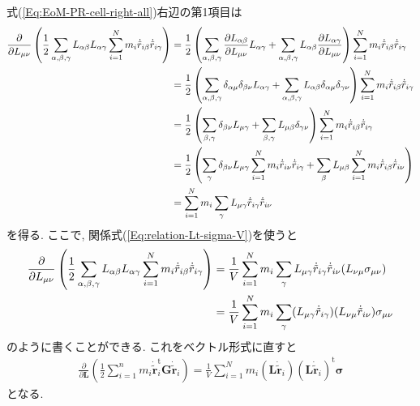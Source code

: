 式(\ref{Eq:EoM-PR-cell-right-all})右辺の第1項目は
\begin{align}
  \frac{\partial}{\partial L_{\mu\nu}}
  \left(
    \frac{1}{2}
    \sum_{\alpha,\beta,\gamma}
    L_{\alpha\beta} L_{\alpha\gamma}
    \sum_{i=1}^{N} m_{i}
    \dot{\tilde{r}}_{i\beta} \dot{\tilde{r}}_{i\gamma}
  \right)
  &=
  \frac{1}{2}
  \left(
    \sum_{\alpha,\beta,\gamma}
    \frac{\partial L_{\alpha\beta}}{\partial L_{\mu\nu}} L_{\alpha\gamma}
    +
    \sum_{\alpha,\beta,\gamma}
    L_{\alpha\beta}
    \frac{\partial L_{\alpha\gamma}}{\partial L_{\mu\nu}}
  \right)
  \sum_{i=1}^{N} m_{i}
  \dot{\tilde{r}}_{i\beta} \dot{\tilde{r}}_{i\gamma}
  \notag \\
  &=
  \frac{1}{2}
  \left(
    \sum_{\alpha,\beta,\gamma}
    \delta_{\alpha\mu} \delta_{\beta\nu} L_{\alpha\gamma}
    +
    \sum_{\alpha,\beta,\gamma}
    L_{\alpha\beta}
    \delta_{\alpha\mu} \delta_{\gamma\nu}
  \right)
  \sum_{i=1}^{N} m_{i}
  \dot{\tilde{r}}_{i\beta} \dot{\tilde{r}}_{i\gamma}
  \notag \\
  &=
  \frac{1}{2}
  \left(
    \sum_{\beta,\gamma}
    \delta_{\beta\nu} L_{\mu\gamma}
    +
    \sum_{\beta,\gamma}
    L_{\mu\beta} \delta_{\gamma\nu}
  \right)
  \sum_{i=1}^{N} m_{i}
  \dot{\tilde{r}}_{i\beta} \dot{\tilde{r}}_{i\gamma}
  \notag \\
  &=
  \frac{1}{2}
  \left(
    \sum_{\gamma}
    \delta_{\beta\nu} L_{\mu\gamma}
    \sum_{i=1}^{N} m_{i}
    \dot{\tilde{r}}_{i\nu} \dot{\tilde{r}}_{i\gamma}
    +
    \sum_{\beta}
    L_{\mu\beta}
    \sum_{i=1}^{N} m_{i}
    \dot{\tilde{r}}_{i\beta} \dot{\tilde{r}}_{i\nu}
  \right)
  \notag \\
  &=
  \sum_{i=1}^{N}
  m_{i}
  \sum_{\gamma} L_{\mu\gamma}
  \dot{\tilde{r}}_{i\gamma} \dot{\tilde{r}}_{i\nu}
\end{align}
を得る. ここで, 関係式(\ref{Eq:relation-Lt-sigma-V})を使うと
\begin{align}
  \frac{\partial}{\partial L_{\mu\nu}}
  \left(
    \frac{1}{2}
    \sum_{\alpha,\beta,\gamma}
    L_{\alpha\beta} L_{\alpha\gamma}
    \sum_{i=1}^{N} m_{i}
    \dot{\tilde{r}}_{i\beta} \dot{\tilde{r}}_{i\gamma}
  \right)
  &=
  \frac{1}{V}
  \sum_{i=1}^{N} m_{i}
  \sum_{\gamma} L_{\mu\gamma}
  \dot{\tilde{r}}_{i\gamma} \dot{\tilde{r}}_{i\nu} (L_{\nu\mu}\sigma_{\mu\nu})
  \notag \\
  &=
  \frac{1}{V}
  \sum_{i=1}^{N} m_{i} \sum_{\gamma}
  (L_{\mu\gamma} \dot{\tilde{r}}_{i\gamma})
  (L_{\nu\mu} \dot{\tilde{r}}_{i\nu}) \sigma_{\mu\nu}
\end{align}
のように書くことができる. これをベクトル形式に直すと
\begin{align}
  \frac{\partial}{\partial \bm{L}}
  \left(
    \frac{1}{2}
    \sum_{i=1}^{n} m_{i}
    \dot{\tilde{\bm{r}}}_{i}^{\mathrm{t}} \bm{G} \dot{\tilde{\bm{r}}}_{i}
  \right)
  =
  \frac{1}{V}
  \sum_{i=1}^{N} m_{i}
  (\bm{L}\dot{\tilde{\bm{r}}}_{i})
  (\bm{L}\dot{\tilde{\bm{r}}}_{i})^{\mathrm{t}}
  \bm{\sigma}
  \label{Eq:EoM-PR-cell-right1}
\end{align}
となる. 

